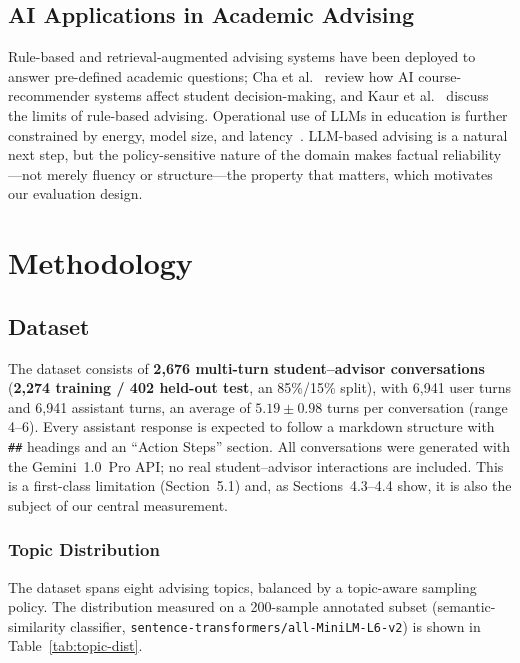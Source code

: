 \documentclass[11pt, a4paper]{article}
\begin{document}
\subsection{AI Applications in Academic Advising}
Rule-based and retrieval-augmented advising systems have been deployed to answer pre-defined academic questions; Cha et al.~\cite{cha2024} review how AI course-recommender systems affect student decision-making, and Kaur et al.~\cite{kaur2022} discuss the limits of rule-based advising. Operational use of LLMs in education is further constrained by energy, model size, and latency~\cite{zhao2023}. LLM-based advising is a natural next step, but the policy-sensitive nature of the domain makes factual reliability---not merely fluency or structure---the property that matters, which motivates our evaluation design.

\section{Methodology}

\subsection{Dataset}
The dataset consists of \textbf{2{,}676 multi-turn student--advisor conversations} (\textbf{2{,}274 training / 402 held-out test}, an 85\%/15\% split), with 6{,}941 user turns and 6{,}941 assistant turns, an average of $5.19 \pm 0.98$ turns per conversation (range 4--6). Every assistant response is expected to follow a markdown structure with \texttt{\#\#} headings and an ``Action Steps'' section. All conversations were generated with the Gemini~1.0~Pro API; no real student--advisor interactions are included. This is a first-class limitation (Section~5.1) and, as Sections~4.3--4.4 show, it is also the subject of our central measurement.

\subsubsection{Topic Distribution}
The dataset spans eight advising topics, balanced by a topic-aware sampling policy. The distribution measured on a 200-sample annotated subset (semantic-similarity classifier, \texttt{sentence-transformers/all-MiniLM-L6-v2}) is shown in Table~\ref{tab:topic-dist}.
\end{document}
